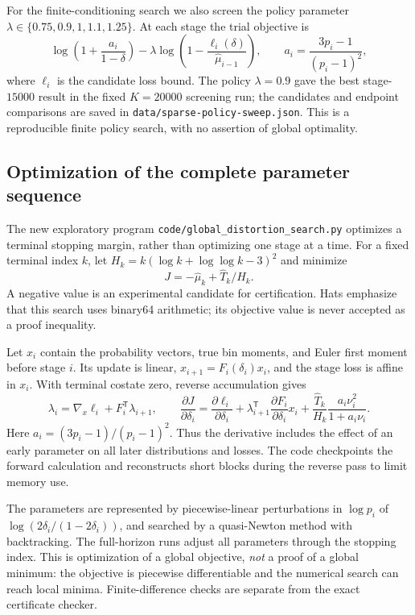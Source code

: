 \documentclass[11pt]{article}
\begin{document}
For the finite-conditioning search we also screen the policy parameter
$\lambda\in\{0.75,0.9,1,1.1,1.25\}$. At each stage the trial objective is
\[
 \log\left(1+\frac{a_i}{1-\delta}\right)
 -\lambda\log\left(1-\frac{\ell_i(\delta)}{\widehat\mu_{i-1}}\right),
 \qquad a_i=\frac{3p_i-1}{(p_i-1)^2},
\]
where $\ell_i$ is the candidate loss bound. The policy $\lambda=0.9$
gave the best stage-$15000$ result in the fixed $K=20000$ screening run;
the candidates and endpoint comparisons are saved in
\texttt{data/sparse-policy-sweep.json}. This is a reproducible finite
policy search, with no assertion of global optimality.

\subsection{Optimization of the complete parameter sequence}
The new exploratory program \texttt{code/global\_distortion\_search.py}
optimizes a terminal stopping margin, rather than optimizing one stage at
a time. For a fixed terminal index $k$, let
$H_k=k(\log k+\log\log k-3)^2$ and minimize
\[
 J=-\widehat\mu_k+\widehat T_k/H_k.
\]
A negative value is an experimental candidate for certification. Hats
emphasize that this search uses binary64 arithmetic; its objective value
is never accepted as a proof inequality.

Let $x_i$ contain the probability vectors, true bin moments, and Euler
first moment before stage $i$. Its update is linear,
$x_{i+1}=F_i(\delta_i)x_i$, and the stage loss is affine in $x_i$.
With terminal costate zero, reverse accumulation gives
\[
 \lambda_i=\nabla_x\ell_i+F_i^{\mathsf T}\lambda_{i+1},\qquad
 \frac{\partial J}{\partial\delta_i}
 =\frac{\partial\ell_i}{\partial\delta_i}
  +\lambda_{i+1}^{\mathsf T}\frac{\partial F_i}{\partial\delta_i}x_i
  +\frac{\widehat T_k}{H_k}
       \frac{a_i\nu_i^2}{1+a_i\nu_i}.
\]
Here $a_i=(3p_i-1)/(p_i-1)^2$. Thus the derivative includes the effect of
an early parameter on all later distributions and losses. The code
checkpoints the forward calculation and reconstructs short blocks during
the reverse pass to limit memory use.

The parameters are represented by piecewise-linear perturbations in
$\log p_i$ of $\log(2\delta_i/(1-2\delta_i))$, and searched by a
quasi-Newton method with backtracking. The full-horizon runs adjust all
parameters through the stopping index. This is optimization of a global
objective, \emph{not} a proof of a global minimum: the objective is
piecewise differentiable and the numerical search can reach local minima.
Finite-difference checks are separate from the exact certificate checker.
\end{document}
